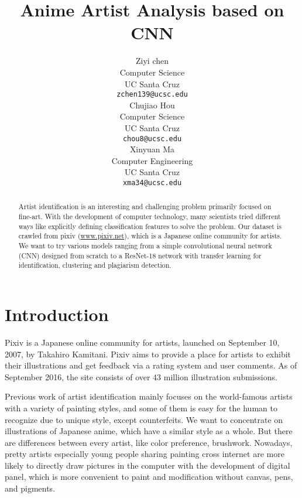 \documentclass[11pt]{article}
\title{Anime Artist Analysis based on CNN}
\author{Ziyi chen \\
  Computer Science  \\
  UC Santa Cruz\\
  {\tt zchen139@ucsc.edu} \\\And
   Chujiao Hou\\
  Computer Science  \\
  UC Santa Cruz\\
  {\tt chou8@ucsc.edu} \\\And
   Xinyuan Ma\\
  Computer Engineering  \\
  UC Santa Cruz\\
  {\tt xma34@ucsc.edu} \\}
\date{}
\begin{document}
\maketitle
\begin{abstract}

Artist identification is an interesting and challenging problem primarily focused on fine-art. With the development of computer technology, many scientists tried different ways like explicitly defining classification features to solve the problem. Our dataset is crawled from pixiv (\url {www.pixiv.net}), which is a Japanese online community for artists. We want to try various models ranging from a simple convolutional neural network (CNN) designed from scratch to a ResNet-18 network with transfer learning for identification, clustering and plagiarism detection.

\end{abstract}

\section{Introduction}


Pixiv is a Japanese online community for artists, launched on September 10, 2007, by Takahiro Kamitani.  Pixiv aims to provide a place for artists to exhibit their illustrations and get feedback via a rating system and user comments. As of September 2016, the site consists of over 43 million illustration submissions. 

Previous work of artist identification mainly focuses on the world-famous artists with a variety of painting styles, and some of them is easy for the human to recognize due to unique style, except counterfeits. We want to concentrate on illustrations of Japanese anime, which have a similar style as a whole. But there are differences between every artist, like color preference, brushwork. Nowadays, pretty artists especially young people sharing painting cross internet are more likely to directly draw pictures in the computer with the development of digital panel, which is more convenient to paint and modification without canvas, pens, and pigments.
\end{document}
